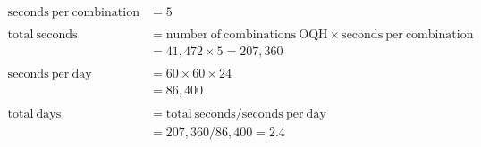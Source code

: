 \documentclass[preview, border=2mm]{standalone}
\begin{document}
\vspace*{\fill}

{\fontsize{32pt}{40pt}\selectfont
    \begin{align*}
        \mathrm{seconds\ per\ combination} &= 5 \\
        \\
        \mathrm{total\ seconds} &= \mathrm{number\ of\ combinations\ OQH} \times \mathrm{seconds\ per\ combination} \\
            &= 41,472 \times 5 = 207,360 \\
        \\
        \mathrm{seconds\ per\ day} &= 60 \times 60 \times 24 \\
            &= 86,400 \\
        \\
        \mathrm{total\ days} &= \mathrm{total\ seconds} / \mathrm{seconds\ per\ day} \\
            &= 207,360 / 86,400 = 2.4
    \end{align*}
}

\vspace*{\fill}
\end{document}
